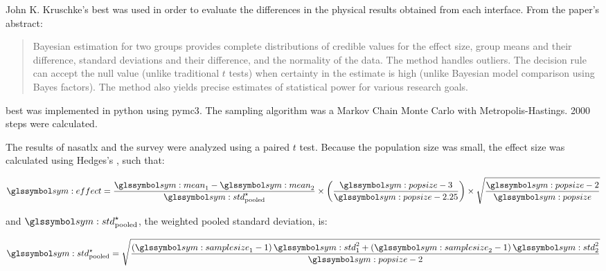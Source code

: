   John K. Kruschke's \gls{best}\cite{kruschke2013} was used in order to evaluate the differences in the physical results obtained from each interface.
  From the paper's abstract:
  
  \begin{quote}
    Bayesian estimation for two groups provides complete distributions of credible values for the effect size, group means and their difference, standard deviations and their difference, and the normality of the data.
    The method handles outliers.
    The decision rule can accept the null value (unlike traditional $t$ tests) when certainty in the estimate is high (unlike Bayesian model comparison using Bayes factors).
    The method also yields precise estimates of statistical power for various research goals.
  \end{quote}

  \gls{best} was implemented in \gls{python} using \gls{pymc3}.
  The sampling algorithm was a Markov Chain Monte Carlo with Metropolis-Hastings.
  2000 steps were calculated.

  The results of \gls{nasatlx} and the survey were analyzed using a paired $t$ test. Because the population size was small, the effect size was calculated using Hedges's , such that:

  \begin{equation}
    \sym{effect} = \frac{\sym{mean}_1 - \sym{mean}_2}{\sym{std}^\star_\mathrm{pooled}} \times \left(\frac{\sym{popsize} - 3}{\sym{popsize}-2.25}\right) \times \sqrt{\frac{\sym{popsize}-2}{\sym{popsize}}}
  \end{equation}

  \noindent and $\sym{std}^\star_\mathrm{pooled}$, the weighted pooled standard deviation, is:

  \begin{equation}
    \sym{std}^\star_\mathrm{pooled} = \sqrt{\frac{\left(\sym{samplesize}_1-1\right) \sym{std}_1^2 + \left(\sym{samplesize}_2-1\right)\sym{std}_2^2}{\sym{popsize}-2}}
  \end{equation}

